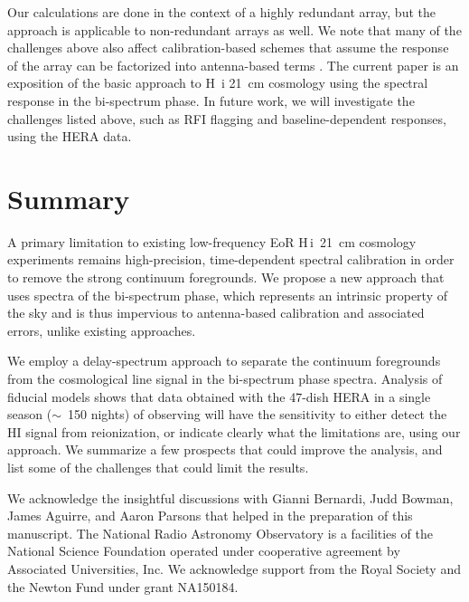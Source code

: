 \documentclass[
reprint,
superscriptaddress,
amsmath,
amssymb,
aps,
prd
]{revtex4-1}
\newcommand{\HI}{H\,{\sc i}}
\begin{document}
Our calculations are done in the context of a highly redundant array, but the approach is applicable to non-redundant arrays as well. We note that many of the challenges above also affect calibration-based schemes that assume the response of the array can be factorized into antenna-based terms \cite{car18}. The current paper is an exposition of the basic approach to H~{\sc i} 21~cm cosmology using the spectral response in the bi-spectrum phase. In future work, we will investigate the challenges listed above, such as RFI flagging and baseline-dependent responses, using the HERA data.

\section{Summary}\label{sec:summary}

A primary limitation to existing low-frequency EoR \HI\ 21~cm cosmology experiments remains high-precision, time-dependent spectral calibration in order to remove the strong continuum foregrounds. We propose a new approach that uses spectra of the bi-spectrum phase, which represents an intrinsic property of the sky and is thus impervious to antenna-based calibration and associated errors, unlike existing approaches.
  
We employ a delay-spectrum approach to separate the continuum foregrounds from the cosmological line signal in the bi-spectrum phase spectra. Analysis of fiducial models shows that data obtained with the 47-dish HERA in a single season ($\sim$~150 nights) of observing will have the sensitivity to either detect the HI signal from reionization, or indicate clearly what the limitations are, using our approach. We summarize a few prospects that could improve the analysis, and list some of the challenges that could limit the results. 

\begin{acknowledgments}
We acknowledge the insightful discussions with Gianni Bernardi, Judd Bowman, James Aguirre, and Aaron Parsons that helped in the preparation of this manuscript. The National Radio Astronomy Observatory is a facilities of the National Science Foundation operated under cooperative agreement by Associated Universities, Inc. We acknowledge support from the Royal Society and the Newton Fund under grant NA150184.
\end{acknowledgments}

\end{document}

